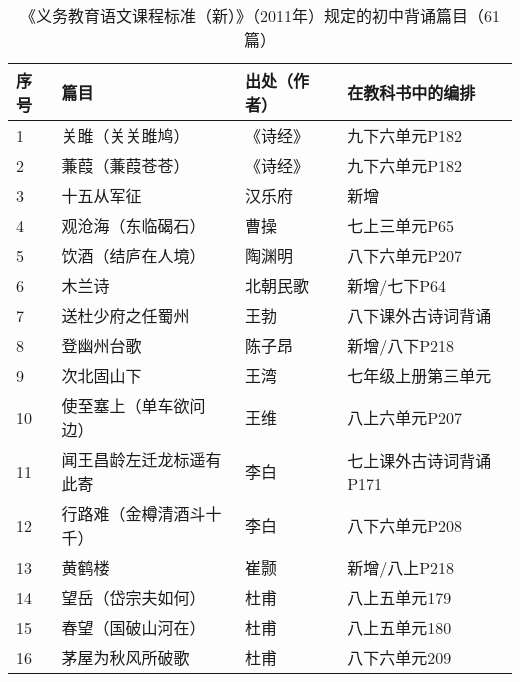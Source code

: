\documentclass[12pt]{ctexart}
\begin{document}
\begin{longtable}{@{}llll@{}}
    \caption{《义务教育语文课程标准（新）》（2011年）规定的初中背诵篇目（61篇）}\\
    \toprule
    \endhead
    序号  & 篇目                        & 出处（作者） & 在教科书中的编排        \\* \midrule
    1   & 关雎（关关雎鸠）                  & 《诗经》   & 九下六单元P182       \\* \midrule
    2   & 蒹葭（蒹葭苍苍）                  & 《诗经》   & 九下六单元P182       \\* \midrule
    3   & 十五从军征                     & 汉乐府    & 新增              \\* \midrule
    4   & 观沧海（东临碣石）                 & 曹操     & 七上三单元P65        \\* \midrule
    5   & 饮酒（结庐在人境）                 & 陶渊明    & 八下六单元P207       \\* \midrule
    6   & 木兰诗                       & 北朝民歌   & 新增/七下P64        \\* \midrule
    7   & 送杜少府之任蜀州                  & 王勃     & 八下课外古诗词背诵       \\* \midrule
    8   & 登幽州台歌                     & 陈子昂    & 新增/八下P218       \\* \midrule
    9   & 次北固山下                     & 王湾     & 七年级上册第三单元       \\* \midrule
    10  & 使至塞上（单车欲问边）               & 王维     & 八上六单元P207       \\* \midrule
    11  & 闻王昌龄左迁龙标遥有此寄              & 李白     & 七上课外古诗词背诵P171   \\* \midrule
    12  & 行路难（金樽清酒斗十千）              & 李白     & 八下六单元P208       \\* \midrule
    13  & 黄鹤楼                       & 崔颢     & 新增/八上P218       \\* \midrule
    14  & 望岳（岱宗夫如何）                 & 杜甫     & 八上五单元179        \\* \midrule
    15  & 春望（国破山河在）                 & 杜甫     & 八上五单元180        \\* \midrule
    16  & 茅屋为秋风所破歌                  & 杜甫     & 八下六单元209        \\* \midrule

\end{longtable}
\end{document}
